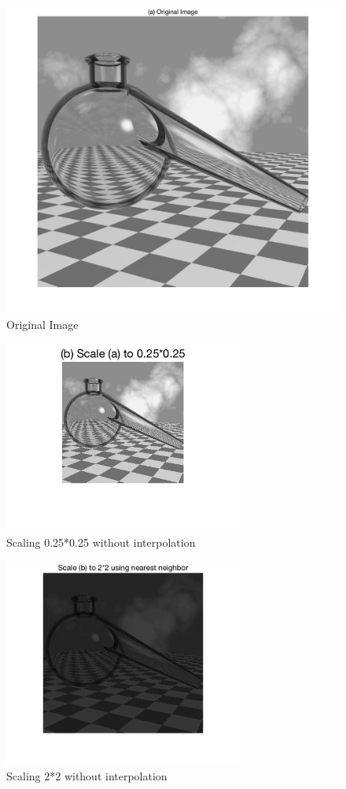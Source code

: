 \documentclass[11pt,oneside]{book}
\begin{document}
\begin{figure}[!htb]
   \centering  
   \includegraphics[width=1\textwidth]{images/6/scale.jpg}
   \caption{Original Image}
\end{figure}
\newpage
\begin{figure}[!htb]
   \centering  
   \includegraphics[width=0.7\textwidth]{images/6/scale_5.jpg}
   \caption{Scaling 0.25*0.25 without interpolation}
\end{figure}
\begin{figure}[!htb]
   \centering  
   \includegraphics[width=0.7\textwidth]{images/6/scale_2.jpg}
   \caption{Scaling 2*2 without interpolation}
\end{figure}
\newpage
\end{document}
